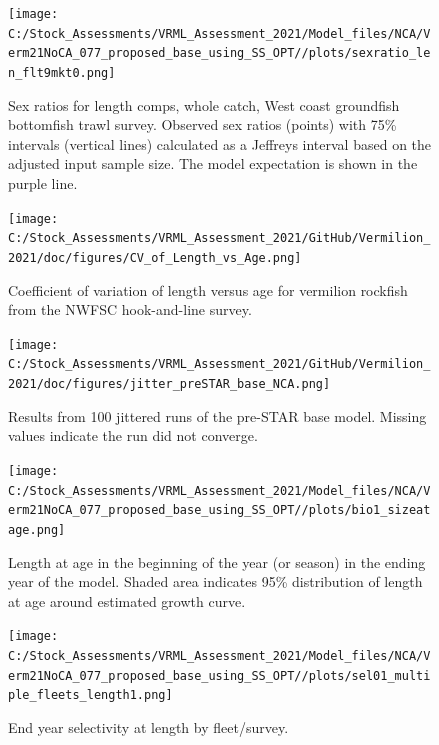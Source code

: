 \documentclass[
  english,
  a4paper,
]{article}
\begin{document}
\begin{figure}
\centering
\texttt{[image: C:/Stock\_Assessments/VRML\_Assessment\_2021/Model\_files/NCA/Verm21NoCA\_077\_proposed\_base\_using\_SS\_OPT//plots/sexratio\_len\_flt9mkt0.png]}
\caption{Sex ratios for length comps, whole catch, West coast groundfish bottomfish trawl survey. Observed sex ratios (points) with 75\% intervals (vertical lines) calculated as a Jeffreys interval based on the adjusted input sample size. The model expectation is shown in the purple line.\label{fig:sexratio-NWFSC-TWL}}
\end{figure}

\FloatBarrier

\begin{figure}
\centering
\texttt{[image: C:/Stock\_Assessments/VRML\_Assessment\_2021/GitHub/Vermilion\_2021/doc/figures/CV\_of\_Length\_vs\_Age.png]}
\caption{Coefficient of variation of length versus age for vermilion rockfish from the NWFSC hook-and-line survey.\label{fig:cv-length-age}}
\end{figure}

\begin{figure}
\centering
\texttt{[image: C:/Stock\_Assessments/VRML\_Assessment\_2021/GitHub/Vermilion\_2021/doc/figures/jitter\_preSTAR\_base\_NCA.png]}
\caption{Results from 100 jittered runs of the pre-STAR base model. Missing values indicate the run did not converge.\label{fig:jitter}}
\end{figure}

\begin{figure}
\centering
\texttt{[image: C:/Stock\_Assessments/VRML\_Assessment\_2021/Model\_files/NCA/Verm21NoCA\_077\_proposed\_base\_using\_SS\_OPT//plots/bio1\_sizeatage.png]}
\caption{Length at age in the beginning of the year (or season) in the ending year of the model. Shaded area indicates 95\% distribution of length at age around estimated growth curve.\label{fig:fittedgrowth}}
\end{figure}

\FloatBarrier

\begin{figure}
\centering
\texttt{[image: C:/Stock\_Assessments/VRML\_Assessment\_2021/Model\_files/NCA/Verm21NoCA\_077\_proposed\_base\_using\_SS\_OPT//plots/sel01\_multiple\_fleets\_length1.png]}
\caption{End year selectivity at length by fleet/survey.\label{fig:selex-length-all}}
\end{figure}

\FloatBarrier
\end{document}
